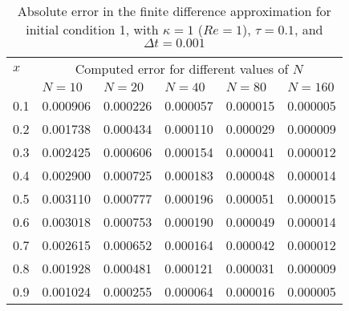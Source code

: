 \documentclass[undefended]{sfuthesis}
\begin{document}
\begin{table}[!h]%
	\centering
	\begin{threeparttable}
		\caption{Absolute error in the finite difference approximation for initial condition 1, with $\kappa = 1$ ($Re = 1$), $\tau = 0.1$, and $\Delta t = 0.001$}
		\label{tab:error1}
		\begin{tabular}{p{.13\linewidth} p{.15\linewidth} p{.15\linewidth} p{.15\linewidth} p{.15\linewidth} p{.1\linewidth}}
			\toprule
			$x$ & \multicolumn{5}{c}{Computed error for different values of $N$} \\
			\cmidrule{2-6}
		   	& $N = 10$ & $N = 20$ & $N = 40$ & $N = 80$ & $N = 160$\\
			\midrule
			0.1 & 0.000906 & 0.000226 & 0.000057 & 0.000015 & 0.000005 \\
			0.2 & 0.001738 & 0.000434 & 0.000110 & 0.000029 & 0.000009 \\
			0.3 & 0.002425 & 0.000606 & 0.000154 & 0.000041 & 0.000012 \\
			0.4 & 0.002900 & 0.000725 & 0.000183 & 0.000048 & 0.000014 \\
			0.5 & 0.003110 & 0.000777 & 0.000196 & 0.000051 & 0.000015 \\
			0.6 & 0.003018 & 0.000753 & 0.000190 & 0.000049 & 0.000014 \\
			0.7 & 0.002615 & 0.000652 & 0.000164 & 0.000042 & 0.000012 \\
			0.8 & 0.001928 & 0.000481 & 0.000121 & 0.000031 & 0.000009 \\
			0.9 & 0.001024 & 0.000255 & 0.000064 & 0.000016 & 0.000005 \\
			\bottomrule
		\end{tabular}
	\end{threeparttable}
\end{table}
\end{document}
